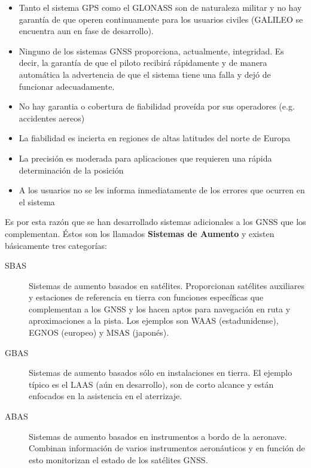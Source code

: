 \begin{itemize}
\item  Tanto el sistema GPS como el GLONASS son de
  naturaleza militar y no hay garant\'ia de que operen continuamente
  para los usuarios civiles (GALILEO se encuentra aun en fase de
  desarrollo).

\item  Ninguno de los sistemas GNSS proporciona,  actualmente, integridad. Es decir, la garant\'ia de que el piloto
  recibir\'a r\'apidamente y de manera autom\'atica la advertencia de que el
  sistema tiene una falla y dej\'o de funcionar adecuadamente.

\item  No hay garantia o cobertura de fiabilidad prove\'ida por sus operadores (e.g. accidentes aereos)
\item La fiabilidad es incierta en regiones de altas latitudes del norte de Europa
\item La precisi\'on es moderada para aplicaciones que requieren una r\'apida determinaci\'on de la posici\'on
\item A los usuarios no se les informa inmediatamente de los errores que ocurren en el sistema
\end{itemize}

Es por esta raz\'on que se han desarrollado sistemas adicionales a los GNSS que los complementan. \'Estos son los llamados \textbf{Sistemas de Aumento} y existen b\'asicamente tres categor\'ias:


\begin{description}
\item [SBAS] Sistemas de aumento basados en sat\'elites. Proporcionan sat\'elites auxiliares y estaciones de referencia en tierra con funciones espec\'ificas que complementan a los GNSS y los hacen aptos
  para navegaci\'on en ruta y aproximaciones a la pista. Los ejemplos
  son WAAS (estadunidense), EGNOS (europeo) y MSAS (japon\'es).

\item [GBAS] Sistemas de aumento basados s\'olo en instalaciones en
  tierra. El ejemplo t\'ipico es el LAAS (a\'un en desarrollo), son de
  corto alcance y est\'an enfocados en la asistencia en el aterrizaje.

\item [ABAS] Sistemas de aumento basados en instrumentos a bordo de la
  aeronave. Combinan informaci\'on de varios instrumentos aeron\'auticos y
  en funci\'on de esto monitorizan el estado de los sat\'elites GNSS.
\end{description}


